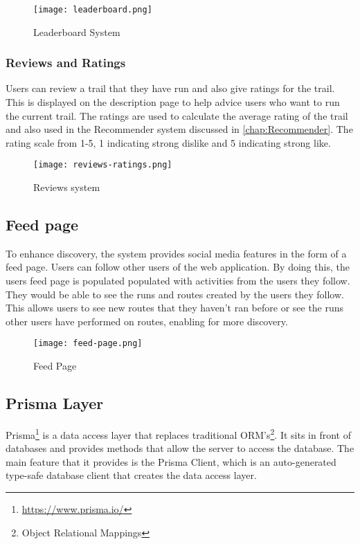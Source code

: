 \begin{figure}[htb!]
    \centering
    \texttt{[image: leaderboard.png]}
    \caption{Leaderboard System}
    \label{fig:leaderboard}
\end{figure}

\subsubsection{Reviews and Ratings}
Users can review a trail that they have run and also give ratings for the trail. This is displayed on the description page to help advice users who want to run the current trail. The ratings are used to calculate the average rating of the trail and also used in the Recommender system discussed in \autoref{chap:Recommender}. The rating scale \cite{wright1982rating} from 1-5, 1 indicating strong dislike and 5 indicating strong like.

\begin{figure}[htb!]
    \centering
    \texttt{[image: reviews-ratings.png]}
    \caption{Reviews system}
    \label{fig:reviews}
\end{figure}

\subsection{Feed page}
To enhance discovery, the system provides social media features in the form of a feed page. Users can follow other users of the web application. By doing this, the users feed page is populated populated with activities from the users they follow. They would be able to see the runs and routes created by the users they follow. This allows users to see new routes that they haven't ran before or see the runs other users have performed on routes, enabling for more discovery.

\begin{figure}[htb!]
    \centering
    \texttt{[image: feed-page.png]}
    \caption{Feed Page}
    \label{fig:feedPage}
\end{figure}


\subsection{Prisma Layer}
Prisma\footnote{\url{https://www.prisma.io/}} is a data access layer that replaces traditional ORM's\footnote{Object Relational Mappings}. It sits in front of databases and provides methods that allow the server to access the database. The main feature that it provides is the Prisma Client, which is an auto-generated type-safe database client that creates the data access layer.

